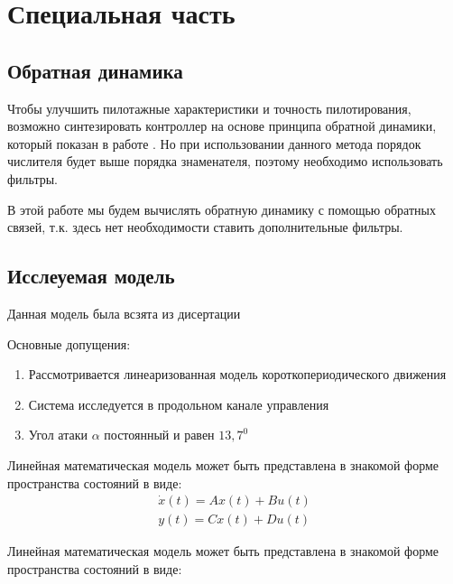 \newpage
\section{Специальная часть}
\subsection{Обратная динамика}
\pagestyle{fancy}
\fancyhf{}
\rfoot{\thepage}

Чтобы улучшить пилотажные характеристики и точность пилотирования, возможно синтезировать контроллер на основе 
принципа обратной динамики, который показан в работе {\cite{Zoe}}. Но при использовании данного метода порядок числителя будет выше порядка знаменателя, поэтому необходимо использовать фильтры.

В этой работе мы будем вычислять обратную динамику с помощью обратных связей, т.к. здесь нет необходимости ставить дополнительные фильтры.

\subsection{Исслеуемая модель}

Данная модель была всзята из дисертации {\cite{Diser}}

Основные допущения: 
\begin{enumerate}
    \item Рассмотривается линеаризованная модель короткопериодического движения 
    \item Система исследуется в продольном канале управления
    \item Угол атаки $\alpha$ постоянный и равен $13,7^0$ 
\end{enumerate}

Линейная математическая модель может быть представлена в знакомой форме пространства состояний в виде:
\begin{equation}
    \begin{aligned}
        \dot{x}(t) = Ax(t) + Bu(t) \\
        y(t) = Cx(t) + Du(t)
    \end{aligned}
\end{equation}

Линейная математическая модель может быть представлена в знакомой форме пространства состояний в виде:

